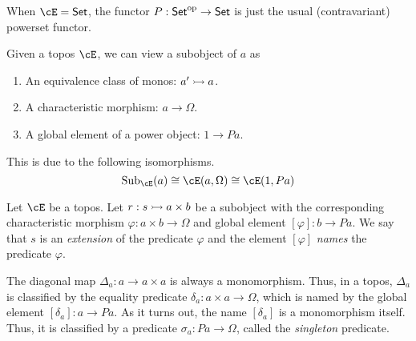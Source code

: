\documentclass[article,10pt,oneside]{memoir}
\begin{document}
\begin{eg}
  When $\cE = \CSet$, the functor $P : \mathsf{Set}^{\mathrm{op}} \to \mathsf{Set}$ is just the usual (contravariant) powerset functor.
\end{eg}

\begin{rmk}
  Given a topos $\cE$, we can view a subobject of $a$ as
  \begin{enumerate}
  \item An equivalence class of monos: $a' \rightarrowtail a$.
  \item A characteristic morphism: $a \to \Omega$.
  \item A global element of a power object: $1 \to Pa$.
  \end{enumerate}
  This is due to the following isomorphisms.
  \[
    \Sub_{\cE}(a) \iso \cE(a, \Omega) \iso \cE(1, Pa)
  \]
\end{rmk}

\begin{defn}
  Let $\cE$ be a topos.
  Let $r : s \rightarrowtail a \times b$ be a subobject with the corresponding characteristic morphism $\varphi : a \times b \to \Omega$ and global element $[\varphi] : b \to Pa$.
  We say that $s$ is an \emph{extension} of the predicate $\varphi$ and the element $[\varphi]$ \emph{names} the predicate $\varphi$.
\end{defn}

\begin{eg}\label{eg:singleton-predicate}
  The diagonal map $\Delta_{a} : a \to a \times a$ is always a monomorphism.
  Thus, in a topos, $\Delta_{a}$ is classified by the equality predicate $\delta_{a} : a \times a \to \Omega$, which is named by the global element $[\delta_{a}] : a \to Pa$.
  As it turns out, the name $[\delta_{a}]$ is a monomorphism itself.
  Thus, it is classified by a predicate $\sigma_{a} : Pa \to \Omega$, called the \emph{singleton} predicate.
\end{eg}
\end{document}
